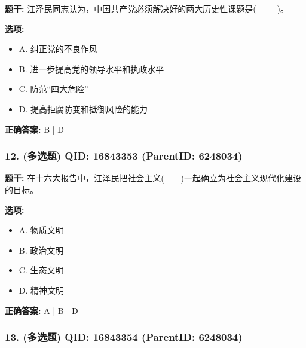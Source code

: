 \documentclass[12pt,UTF8]{ctexart}
\begin{document}
\textbf{题干:}
江泽民同志认为，中国共产党必须解决好的两大历史性课题是(     )。



\textbf{选项:}
\begin{itemize}[leftmargin=*]

  \item A. 纠正党的不良作风

  \item B. 进一步提高党的领导水平和执政水平

  \item C. 防范“四大危险”

  \item D. 提高拒腐防变和抵御风险的能力

\end{itemize}

\textbf{正确答案:}
B | D

\vspace{0.3em}\hrulefill\vspace{0.7em}

\subsubsection*{12. (多选题) \small QID: 16843353 (ParentID: 6248034)}

\textbf{题干:}
在十六大报告中，江泽民把社会主义(    )一起确立为社会主义现代化建设的目标。



\textbf{选项:}
\begin{itemize}[leftmargin=*]

  \item A. 物质文明

  \item B. 政治文明

  \item C. 生态文明

  \item D. 精神文明

\end{itemize}

\textbf{正确答案:}
A | B | D

\vspace{0.3em}\hrulefill\vspace{0.7em}

\subsubsection*{13. (多选题) \small QID: 16843354 (ParentID: 6248034)}
\end{document}
